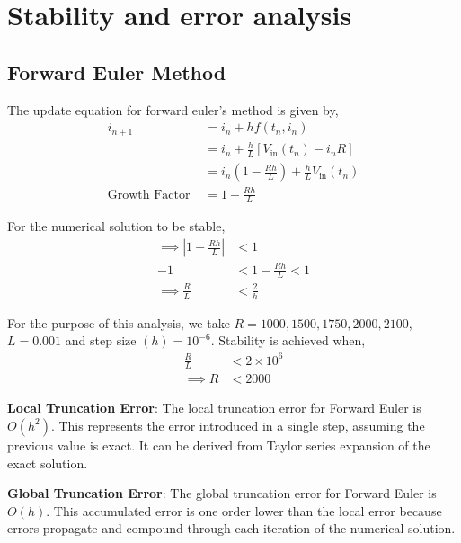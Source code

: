 \documentclass[12pt]{article}
\newcommand{\brak}[1]{\ensuremath{\left(#1\right)}}
\begin{document}
\title{}
\author{}
\section{Stability and error analysis}
\subsection{Forward Euler Method}
The update equation for forward euler's method is given by,
\begin{align*}
i_{n+1} &= i_n + hf(t_n, i_n) \\
        &= i_n + \frac{h}{L} \left[ V_{\text{in}}(t_n) - i_n R \right] \\
        &= i_n \left( 1 - \frac{R h}{L} \right) + \frac{h}{L} V_{\text{in}}(t_n)\\
        \text{Growth Factor } &= 1 - \frac{R h}{L}
\end{align*}

For the numerical solution to be stable,
\begin{align*}
        \implies \left| 1 - \frac{R h}{L} \right| &< 1 \\
        -1 &< 1 - \frac{R h}{L} < 1 \\
        \implies \frac{R}{L} &< \frac{2}{h}
\end{align*}

For the purpose of this analysis, we take $R = 1000, 1500, 1750, 2000, 2100$, $L = 0.001$ and step size $\brak{h} = 10^{-6}$.\newline
Stability is achieved when,
\begin{align*}
    \frac{R}{L} &< 2\times10^6\\
    \implies R &< 2000
\end{align*}

\textbf{Local Truncation Error}: The local truncation error for Forward Euler is $O(h^2)$. This represents the error introduced in a single step, assuming the previous value is exact. It can be derived from Taylor series expansion of the exact solution.

\textbf{Global Truncation Error}: The global truncation error for Forward Euler is $O(h)$. This accumulated error is one order lower than the local error because errors propagate and compound through each iteration of the numerical solution.
\end{document}

